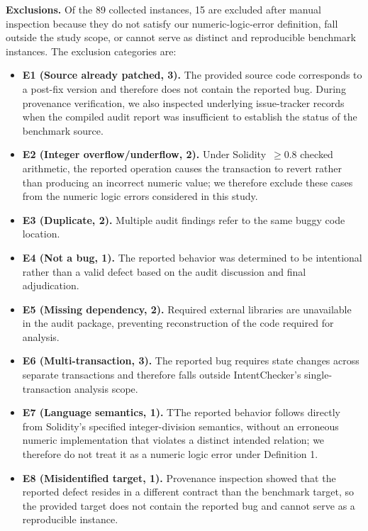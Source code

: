 \documentclass[pdflatex,sn-basic]{sn-jnl}%
\theoremstyle{thmstyleone}%
\theoremstyle{thmstyletwo}%
\theoremstyle{thmstylethree}%
\begin{document}
\smallskip\noindent\textbf{Exclusions.}
Of the 89 collected instances, 15 are excluded after manual inspection because they do not satisfy our numeric-logic-error definition, fall outside the study scope, or cannot serve as distinct and reproducible benchmark instances.
The exclusion categories are:
\begin{itemize}
  \item \textbf{E1 (Source already patched, 3).} The provided source code corresponds to a post-fix version and therefore does not contain the reported bug. During provenance verification, we also inspected underlying issue-tracker records when the compiled audit report was insufficient to establish the status of the benchmark source.
  \item \textbf{E2 (Integer overflow/underflow, 2).} Under Solidity~$\geq$0.8 checked arithmetic, the reported operation causes the transaction to revert rather than producing an incorrect numeric value; we therefore exclude these cases from the numeric logic errors considered in this study.
  \item \textbf{E3 (Duplicate, 2).} Multiple audit findings refer to the same buggy code location.
  \item \textbf{E4 (Not a bug, 1).} The reported behavior was determined to be intentional rather than a valid defect based on the audit discussion and final adjudication.
  \item \textbf{E5 (Missing dependency, 2).} Required external libraries are unavailable in the audit package, preventing reconstruction of the code required for analysis.
  \item \textbf{E6 (Multi-transaction, 3).} The reported bug requires state changes across separate transactions and therefore falls outside IntentChecker's single-transaction analysis scope.
  \item \textbf{E7 (Language semantics, 1).} TThe reported behavior follows directly from Solidity's specified integer-division semantics, without an erroneous numeric implementation that violates a distinct intended relation; we therefore do not treat it as a numeric logic error under Definition 1.
  \item \textbf{E8 (Misidentified target, 1).} Provenance inspection showed that the reported defect resides in a different contract than the benchmark target, so the provided target does not contain the reported bug and cannot serve as a reproducible instance.
\end{itemize}
\end{document}
